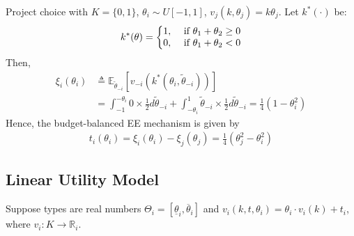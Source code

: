 \documentclass[11pt]{elegantbook_2}
\begin{document}
\begin{example}
    Project choice with $K=\{0,1\}$, $\theta_i\sim U[-1,1]$, $v_j(k,\theta_j)=k\theta_j$. Let $k^*(\cdot)$ be:
    \begin{equation}
        \begin{aligned}
            k^*(\theta)=\left\{\begin{matrix}
                1,&\textnormal{ if }\theta_1+\theta_2\geq 0\\
                0,&\textnormal{ if }\theta_1+\theta_2<0
            \end{matrix}\right.
        \end{aligned}
        \nonumber
    \end{equation}
    Then,
    \begin{equation}
        \begin{aligned}
            \xi_i(\theta_i)&\triangleq\mathbb{E}_{\tilde{\theta}_{-i}}\left[v_{-i}(k^*(\theta_i,\tilde{\theta}_{-i}))\right]\\
            &=\int_{-1}^{-\theta_i}0\times \frac{1}{2} d\tilde{\theta}_{-i}+\int_{-\theta_i}^1 \tilde{\theta}_{-i}\times \frac{1}{2} d\tilde{\theta}_{-i}=\frac{1}{4}(1-\theta_i^2)
        \end{aligned}
        \nonumber
    \end{equation}
    Hence, the budget-balanced EE mechanism is given by
    \begin{equation}
        \begin{aligned}
            t_i(\theta_i)=\xi_i(\theta_i)-\xi_j(\theta_j)=\frac{1}{4}(\theta_j^2-\theta_i^2)
        \end{aligned}
        \nonumber
    \end{equation}
\end{example}

\subsection{Linear Utility Model}
Suppose types are real numbers $\Theta_i=[\underline{\theta}_i,\overline{\theta}_i]$ and $v_i(k,t,\theta_i)=\theta_i\cdot v_i(k)+t_i$, where $v_i:K \rightarrow \mathbb{R}_i$.
\end{document}

